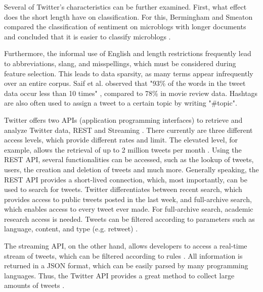 Several of Twitter's characteristics can be further examined.
First, what effect does the short length have on classification. For this, Bermingham and Smeaton compared the classification of sentiment on microblogs with longer documents and concluded that it is easier to classify microblogs \cite{microblogs}.

Furthermore, the informal use of English and length restrictions frequently lead to abbreviations, slang, and misspellings, which must be considered during feature selection. This leads to data sparsity, as many terms appear infrequently over an entire corpus. Saif et al. observed that "93\% of the words in the tweet data occur less than 10 times" \cite[p.~3]{data_sparsity}, compared to 78\% in movie review data. Hashtags are also often used to assign a tweet to a certain topic by writing "\#topic". 

Twitter offers two APIs (application programming interfaces) to retrieve and analyze Twitter data, REST and Streaming \cite{DBLP:journals/csur/GiachanouC16}. There currently are three different access levels, which provide different rates and limit. The elevated level, for example, allows the retrieval of up to 2 million tweets per month \cite{twitter:about}. Using the REST API, several functionalities can be accessed, such as the lookup of tweets, users, the creation and deletion of tweets and much more. Generally speaking, the REST API provides a short-lived connection, which, most importantly, can be used to search for tweets. Twitter differentiates between recent search, which provides access to public tweets posted in the last week, and full-archive search, which enables access to every tweet ever made. For full-archive search, academic research access is needed. Tweets can be filtered according to parameters such as language, content, and type (e.g. retweet) \cite{twitter:search}. 

The streaming API, on the other hand, allows developers to access a real-time stream of tweets, which can be filtered according to rules \cite{twitter:stream}. All information is returned in a JSON format, which can be easily parsed by many programming languages. Thus, the Twitter API provides a great method to collect large amounts of tweets \cite{DBLP:journals/csur/GiachanouC16}.



